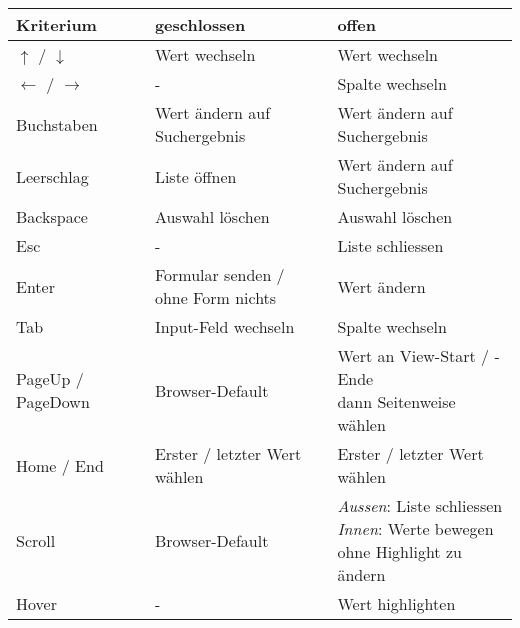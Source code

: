 \begin{table}[ht!] %
    \label{table:interactionNewComponent}
    \footnotesize
    \begin{threeparttable}
        \begin{tabular}{ l || l | l }
            \bf{Kriterium}    & \bf{geschlossen} & \bf{offen} \\
            \hline \hline
            $\uparrow$ / $\downarrow$     & Wert wechseln       & Wert wechseln       \\
            \hline
            $\leftarrow$ / $\rightarrow$  & -                   & Spalte wechseln     \\
            \hline
            Buchstaben  & Wert ändern auf Suchergebnis\tnote{1} & Wert ändern auf Suchergebnis\tnote{1}  \\
            \hline
            Leerschlag  & Liste öffnen    & Wert ändern auf Suchergebnis\tnote{1}     \\
            \hline
            Backspace   & Auswahl löschen & Auswahl löschen        \\
            \hline
            Esc         & -               & Liste schliessen       \\
            \hline \hline
            Enter       & \tbbr{Formular senden / \\ ohne Form nichts} & Wert ändern  \\
            \hline
            Tab         & Input-Feld wechseln              & Spalte wechseln     \\
            \hline
            PageUp / PageDown  & Browser-Default\tnote{2} & \tbbr{Wert an View-Start / -Ende \\ dann Seitenweise wählen} \\
            \hline
            Home / End & Erster / letzter Wert wählen     & Erster / letzter Wert wählen  \\
            \hline \hline
            Scroll     & Browser-Default\tnote{2}         & \tbbr{\textit{Aussen}: Liste schliessen \\
                                                                  \textit{Innen}: Werte bewegen \\ ohne Highlight zu ändern} \\
            \hline
            Hover      & -                & Wert highlighten       \\

\end{tabular}
\end{threeparttable}
\end{table}
